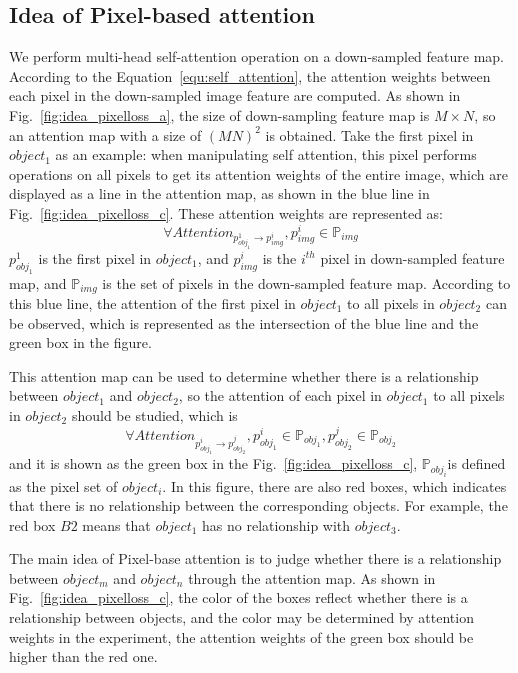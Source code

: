 \subsection{Idea of Pixel-based attention}

We perform multi-head self-attention operation on a down-sampled feature map. According to the Equation~\ref{equ:self_attention},  the attention weights between each pixel in the down-sampled image feature are computed. As shown in Fig.~\ref{fig:idea_pixelloss_a}, the size of down-sampling feature map is $  M\times N $, so an attention map with a size of $ (MN)^2 $ is obtained. Take the first pixel in $ object_1 $ as an example: when manipulating self attention, this pixel performs operations on all pixels to get its attention weights of the entire image, which are displayed as a line in the attention map, as shown in the blue line in Fig.~\ref{fig:idea_pixelloss_c}. These attention weights are represented as:
$$ \forall Attention_{p^1_{obj_1} \to p^i_{img}} , p^i_{img} \in \mathbb{P}_{img} $$ $ p^1_{obj_1} $ is the first pixel in $ object_1 $, and $ p^i_{img} $ is the $ i^{th} $ pixel in down-sampled feature map, and $ \mathbb{P}_{img} $ is the set of pixels in the down-sampled feature map. According to this blue line, the attention of the first pixel in $ object_1 $ to all pixels in $ object_2 $ can be observed, which is represented as the intersection of the blue line and the green box in the figure.

This attention map can be used to determine whether there is a relationship between $ object_1 $ and $ object_2 $, so the attention of each pixel in $ object_1 $ to all pixels in $ object_2 $ should be studied, which is $$ \forall Attention_{p^i_{obj_1} \to p^j_{obj_2}} , p^i_{obj_1} \in \mathbb{P}_{obj_1}, p^j_{obj_2} \in \mathbb{P}_{obj_2}  $$ and it is shown as the green box in the Fig.~\ref{fig:idea_pixelloss_c}, $ \mathbb{P}_{obj_i} $is defined as the pixel set of $ object_i $. In this figure, there are also red boxes, which indicates that there is no relationship between the corresponding objects. For example, the red box $ B2 $ means that $ object_1 $ has no relationship with $ object_3 $.

The main idea of Pixel-base attention is to judge whether there is a relationship between $ object_m $ and $ object_n $ through the attention map. As shown in Fig.~\ref{fig:idea_pixelloss_c}, the color of the boxes reflect whether there is a relationship between objects, and the color may be determined by attention weights in the experiment, the attention weights of the green box should be higher than the red one.

